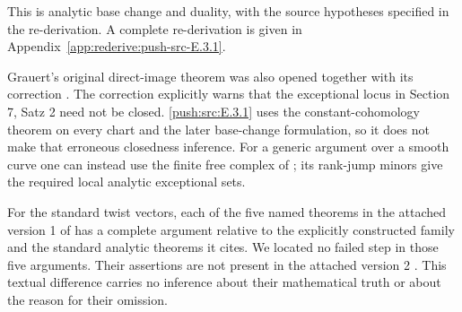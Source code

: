 This is analytic base change and duality, with the source hypotheses specified in the re-derivation. A complete re-derivation is given in Appendix~\ref{app:rederive:push-src-E.3.1}.


Grauert's original direct-image theorem
\cite[Section 6, Hauptsatz I, and Section 7, Satz 5]{Grauert1960D}
was also opened together with its correction \cite{Grauert1963ErratumD}.
The correction explicitly warns that the exceptional locus in
Section 7, Satz 2 need not be closed.  \ref{push:src:E.3.1} uses the
constant-cohomology theorem on every chart and the later
base-change formulation, so it does not make that erroneous
closedness inference.  For a generic argument over a smooth
curve one can instead use the finite free complex of
\cite[Chapter III, Theorem 4.1]{BS76}; its rank-jump minors
give the required local analytic exceptional sets.

\begin{proposition}\label{push:src:E.3.2}
For the standard twist vectors, each of the five named theorems
in the attached version 1 of \cite{DuEtAl2026v1} has a complete
argument relative to the explicitly constructed family and the
standard analytic theorems it cites.  We located no failed step
in those five arguments.  Their assertions are not present in
the attached version 2 \cite{DuEtAl2026v2}.  This textual
difference carries no inference about their mathematical truth
or about the reason for their omission.
\end{proposition}

